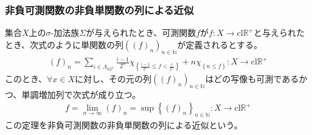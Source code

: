 \documentclass[dvipdfmx]{jsarticle}
\begin{document}
\subsubsection{非負可測関数の非負単関数の列による近似}%
\begin{thm}[非負可測関数の非負単関数の列による近似]\label{4.5.5.18}
集合$X$上の$\sigma$-加法族$\varSigma$が与えられたとき、可測関数$f$が$f:X \rightarrow \mathrm{cl}\mathbb{R}^{+}$と与えられたとき、次式のように単関数の列$\left( (f)_{n} \right)_{n \in \mathbb{N}}$が定義されるとする。
\begin{align*}
(f)_{n} = \sum_{i \in \varLambda_{n2^{n}}} {\frac{i - 1}{2^{n}}\chi_{\left\{ \frac{i - 1}{2^{n}} \leq f < \frac{i}{2^{n}} \right\}}} + n\chi_{\left\{ n \leq f \right\}}:X \rightarrow \mathrm{cl}\mathbb{R}^{+}
\end{align*}
このとき、$\forall x \in X$に対し、その元の列$\left( (f)_{n} \right)_{n \in \mathbb{N}}$はどの写像も可測であるかつ、単調増加列で次式が成り立つ。
\begin{align*}
f = \lim_{n \rightarrow \infty}(f)_{n} = \sup\left\{ (f)_{n} \right\}_{n \in \mathbb{N}}:X \rightarrow \mathrm{cl}\mathbb{R}^{+}
\end{align*}
この定理を非負可測関数の非負単関数の列による近似という。
\end{thm}
\end{document}
